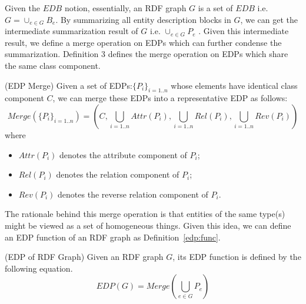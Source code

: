 Given the $EDB$ notion, essentially, an RDF graph $G$ is a set of $EDB$ i.e. $G=\cup_{e \in G}{B_e}$. By summarizing all entity description blocks in $G$, we can get the intermediate summarization result of $G$ i.e. $\cup_{e \in G}{P_e}$ . Given this intermediate result, we define a merge operation on EDPs which can further condense the summarization. Definition 3 defines the merge operation on EDPs which share the same class component. 
\vspace{-1ex}
\begin{definition} 
\label{edp:merge}
(EDP Merge)  Given a set of EDPs:$\{P_i\}_{i=1..n}$ whose elements have identical class component $C$, we can merge these EDPs into a representative EDP as follows:
\begin{equation}
Merge(\{P_i\}_{i=1..n})=(C, \bigcup_{i=1..n}{Attr(P_i)}, \bigcup_{i=1..n}{Rel(P_i)}, \bigcup_{i=1..n}{Rev(P_i)})
\end{equation}
where
\begin{itemize}
\item $Attr(P_i)$ denotes the attribute component of $P_i$;
\item $Rel(P_i)$ denotes the relation component of $P_i$;
\item $Rev(P_i)$ denotes the reverse relation component of $P_i$.
\end{itemize}
\end{definition}

The rationale behind this merge operation is that entities of the same type(s) might be viewed as a set of homogeneous things. Given this idea, we can define an EDP function of an RDF graph as Definition~\ref{edp:func}.
\vspace{-1ex}
\begin{definition} 
\label{edp:func}
(EDP of RDF Graph) Given an RDF graph $G$, its EDP function is defined by the following equation.
\begin{equation}
EDP(G)=Merge(\bigcup_{e \in G}{P_e})
\end{equation}
\end{definition}

\vspace{-5ex}
